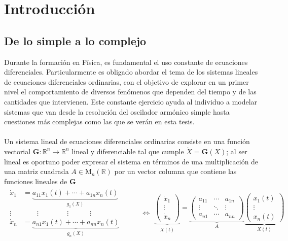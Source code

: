 \chapter{Introducción}

\section*{De lo simple a lo complejo}

\setlength{\parindent}{0cm} Durante la formación en Física, es fundamental el uso constante de ecuaciones diferenciales. Particularmente es obligado abordar el tema de los sistemas lineales de ecuaciones diferenciales ordinarias, con el objetivo de explorar en un primer nivel el comportamiento de diversos fenómenos que dependen del tiempo y de las cantidades que intervienen. Este constante ejercicio ayuda al individuo a modelar sistemas que van desde la resolución del oscilador armónico simple hasta cuestiones más complejas como las que se verán en esta tesis.\\
\\
Un sistema lineal de ecuaciones diferenciales ordinarias consiste en una función vectorial $\textbf{G}:\mathbb{R}^n\to\mathbb{R}^n$ lineal y diferenciable tal que cumple 
$\dot{X}=\textbf{G}(X)$; al ser lineal es oportuno poder expresar el sistema en términos de una multiplicación de una matriz cuadrada $A\in \mathrm{M}_{n}(\mathbb{R})$ por un vector columna que contiene las funciones lineales de $\textbf{G}$ \cite{hirsch2013differential}
\begin{align*}
	\begin{split}
		\dot{x}_1 &= \underbrace{a_{11}x_1(t)+\cdots+a_{1n}x_n(t)}_{g_1(X)}             \\
		\vdots &\qquad \vdots\qquad\qquad\vdots\qquad\quad\vdots  \\
		\dot{x}_n &= \underbrace{a_{n1}x_1(t)+\cdots+a_{nn}x_n(t)}_{g_n(X)}             
	\end{split}	          
	\qquad\ \ \, \Longleftrightarrow
	\begin{split}
		\underbrace{\begin{pmatrix}
				\dot{x}_1\\
				\vdots\\
				\dot{x}_n
		\end{pmatrix}}_{\dot{X}(t)}=\underbrace{\begin{pmatrix}
				a_{11} & \cdots & a_{1n}\\
				\vdots & \ddots & \vdots\\
				a_{n1} & \cdots & a_{nn}
		\end{pmatrix}}_{A}\underbrace{\begin{pmatrix}
				x_1(t)\\
				\vdots\\
				x_n(t)
		\end{pmatrix}}_{X(t)}
	\end{split} 
\end{align*}

